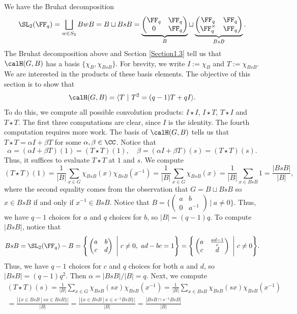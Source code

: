 \documentclass[11pt]{amsart}
\theoremstyle{remark}
\begin{document}
We have the Bruhat decomposition
\[
	\SL_2(\FF_q)=\bigsqcup_{w\in S_2} BwB = B \sqcup BsB = \underbrace{\begin{pmatrix} \FF_q & \FF_q \\ 0 & \FF_q \end{pmatrix}}_{B} \sqcup \underbrace{\begin{pmatrix} \FF_q & \FF_q \\ \FF_q^\times & \FF_q \end{pmatrix}}_{BsB}.
\]
The Bruhat decomposition above and Section \ref{Section1.3} tell us that $\calH(G,B)$ has a basis $\{\chi_B,\chi_{BsB}\}$.
For brevity, we write $I:=\chi_B$ and $T:= \chi_{BsB}$.
We are interested in the products of these basis elements.
The objective of this section is to show that
\[
	\calH(G,B) = \langle T\ |\ T^2 = (q-1)T + qI\rangle.
\]
To do this, we compute all possible convolution products: $I\star I$, $I\star T$, $T\star I$ and $T\star T$.
The first three computations are clear, since $I$ is the identity.
The fourth computation requires more work.
The basis of $\calH(G,B)$ tells us that $T\star T = \alpha I+\beta T$ for some $\alpha,\beta\in\CC$.
Notice that
\[
	\alpha = (\alpha I+\beta T)(1) = (T\star T)(1), \quad \beta = (\alpha I+\beta T)(s) = (T\star T)(s).
\]
Thus, it suffices to evaluate $T\star T$ at $1$ and $s$.
We compute
\[
	(T\star T)(1) = \frac{1}{|B|}\sum_{x\in G} \chi_{BsB}(x)\chi_{BsB}(x^{-1}) = \frac{1}{|B|}\sum_{x\in G} \chi_{BsB}(x) = \frac{1}{|B|}\sum_{x\in BsB} 1 = \frac{|BsB|}{|B|},
\]
where the second equality comes from the observation that $G=B\sqcup BsB$ so $x\in BsB$ if and only if $x^{-1}\in BsB$.
Notice that $B=\{\left(\begin{smallmatrix} a & b \\ 0 & a^{-1}\end{smallmatrix}\right)\ |\ a\neq 0\}$.
Thus, we have $q-1$ choices for $a$ and $q$ choices for $b$, so $|B| = (q-1)q$.
To compute $|BsB|$, notice that
\[
	BsB = \SL_2(\FF_q)-B = \Bigg\{\begin{pmatrix} a & b \\ c & d\end{pmatrix}\ \Bigg|\ c\neq 0,\ ad-bc=1\Bigg\} = \Bigg\{\begin{pmatrix} a & \frac{ad-1}{c} \\ c & d\end{pmatrix}\ \Bigg|\ c\neq 0\Bigg\}.
\]
Thus, we have $q-1$ choices for $c$ and $q$ choices for both $a$ and $d$, so $|BsB| = (q-1)q^2$.
Then $\alpha = |BsB|/|B| = q$.
Next, we compute
\begin{multline*}
	(T\star T)(s) = \frac{1}{|B|}\sum_{x\in G} \chi_{BsB}(sx)\chi_{BsB}(x^{-1}) = \frac{1}{|B|}\sum_{x\in BsB} \chi_{BsB}(sx)\chi_{BsB}(x^{-1}) \\
	= \frac{|\{x\in BsB\ |\ sx\in BsB\}|}{|B|} = \frac{|\{x\in BsB\ |\ x\in s^{-1}BsB\}|}{|B|} = \frac{|BsB\cap s^{-1}BsB|}{|B|}
\end{multline*}
\end{document}
